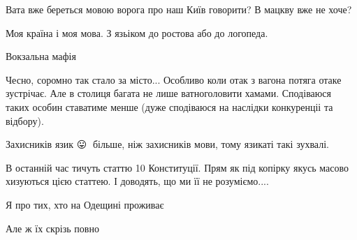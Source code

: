 \begin{itemize}
 
Вата вже береться мовою ворога про наш Київ говорити?
В мацкву вже не хоче?

 
Моя країна і моя мова. З язьіком до ростова або до логопеда.

 
Вокзальна мафія

 

Чесно, соромно так стало за місто... Особливо коли отак з вагона потяга отаке
зустрічає. Але в столиця багата не лише ватноголовити хамами. Сподіваюся таких
особин ставатиме менше (дуже сподіваюся на наслідки конкуренціі та відбору).

 

Захисників язик 😛👅 більше, ніж захисників мови, тому язикаті такі зухвалі.

В останній час тичуть статтю 10 Конституції. Прям як під копірку якусь масово
хизуються цією статтею. І доводять, що ми її не розуміємо....

Я про тих, хто на Одещині проживає

Але ж їх скрізь повно

\begin{itemize}
 

\end{itemize}
\end{itemize}
